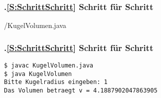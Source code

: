 \def\stitle{Schritt f\"ur Schritt}%
\begin{frame}[t]%
  \frametitle{\kap.\ref{S:SchrittSchritt} \stitle}%
\medskip


{\getexercisefolder/KugelVolumen.java}

\end{frame}


\def\stitle{Schritt f\"ur Schritt}%
\begin{frame}[fragile]%
  \frametitle{\kap.\ref{S:SchrittSchritt} \stitle}%
\medskip

\begin{lstlisting}[title={Um das Programm \code{KugelVolumen} auszuf\"uhren werden folgende Schritte auf dem Terminal durchgef\"uhrt.},style=BASH]
$ javac KugelVolumen.java
$ java KugelVolumen
Bitte Kugelradius eingeben: 1
Das Volumen betraegt v = 4.1887902047863905
\end{lstlisting}

\end{frame}
